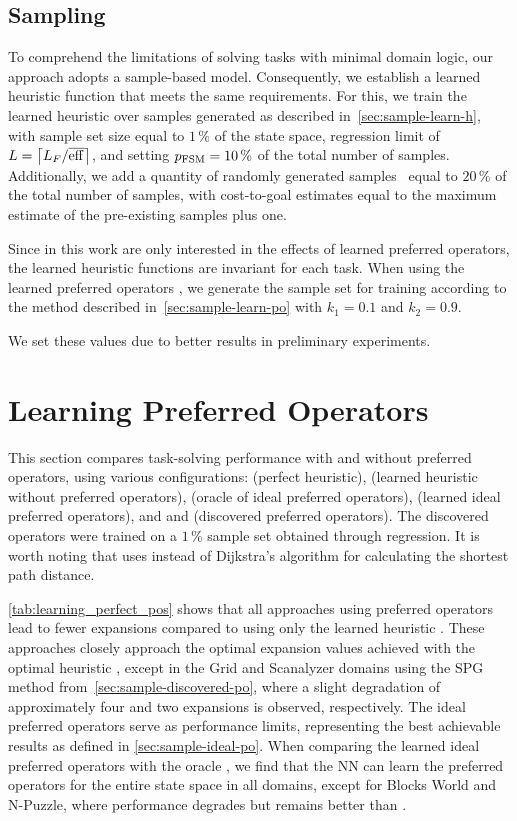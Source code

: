 \documentclass[ppgc,diss,english]{iiufrgs}
\providecommand{\ceil}[1]{\ensuremath{\left\lceil #1\right\rceil}}
\begin{document}
\subsection{Sampling}
\label{sec:exp-sampling}
To comprehend the limitations of solving tasks with minimal domain logic, our approach adopts a sample-based model. Consequently, we establish a learned heuristic function that meets the same requirements.
For this, we train the learned heuristic \hnn over samples generated as described in~\cref{sec:sample-learn-h}, with sample set size equal to $1\,\%$ of the state space, regression limit of $L=\ceil{\facts/\overline{\eff}}$, and setting $p_{\text{FSM}}=10\,\%$ of the total number of samples. Additionally, we add a quantity of randomly generated samples~\cite{OToole/2022} equal to $20\,\%$ of the total number of samples, with cost-to-goal estimates equal to the maximum estimate of the pre-existing samples plus one.

Since in this work are only interested in the effects of learned preferred operators, the learned heuristic functions are invariant for each task. When using the learned preferred operators \pog, we generate the sample set for training according to the method described in~\cref{sec:sample-learn-po} with $k_1 = 0.1$ and $k_2 = 0.9$.

We set these values due to better results in preliminary experiments.

\section{Learning Preferred Operators}
\label{sec:exp-learning-po}
This section compares task-solving performance with and without preferred operators, using various configurations: \hstar (perfect heuristic), \hnn (learned heuristic without preferred operators), \postartable (oracle of ideal preferred operators), \postar (learned ideal preferred operators), and \pogstar and \pog (discovered preferred operators). The discovered operators were trained on a $1\,\%$ sample set obtained through regression. It is worth noting that \pogstar uses \hstar instead of Dijkstra's algorithm for calculating the shortest path distance.



\cref{tab:learning_perfect_pos} shows that all approaches using preferred operators lead to fewer expansions compared to using only the learned heuristic \hnn. These approaches closely approach the optimal expansion values achieved with the optimal heuristic \hstar, except in the Grid and Scanalyzer domains using the SPG method from~\cref{sec:sample-discovered-po}, where a slight degradation of approximately four and two expansions is observed, respectively. The ideal preferred operators serve as performance limits, representing the best achievable results as defined in \cref{sec:sample-ideal-po}. When comparing the learned ideal preferred operators \postar with the oracle \postartable, we find that the NN can learn the preferred operators for the entire state space in all domains, except for Blocks World and N-Puzzle, where performance degrades but remains better than \hnn.
\end{document}
